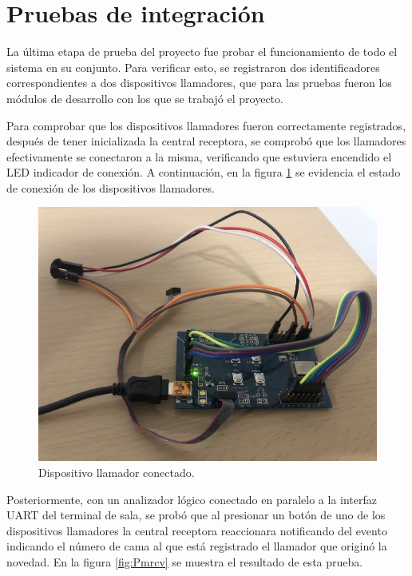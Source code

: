 \section{Pruebas de integración}
\label{sec:pruebasInt}

La última etapa de prueba del proyecto fue probar el funcionamiento de todo el sistema en su conjunto. Para verificar esto, se registraron dos identificadores correspondientes a dos dispositivos llamadores, que para las pruebas fueron los módulos de desarrollo con los que se trabajó el proyecto.

Para comprobar que los dispositivos llamadores fueron correctamente registrados, después de tener inicializada la central receptora, se comprobó que los llamadores efectivamente se conectaron a la misma, verificando que estuviera encendido el LED indicador de conexión. A continuación, en la figura \ref{fig:Pmcon} se evidencia el estado de conexión de los dispositivos llamadores.

\begin{figure}[htpb]
	\centering
	\includegraphics[scale=0.45]{./Figures/callcon.jpeg}	
	\caption{Dispositivo llamador conectado.}
	\label{fig:Pmcon}
\end{figure}

Posteriormente, con un analizador lógico conectado en paralelo a la interfaz UART del terminal de sala, se probó que al presionar un botón de uno de los dispositivos llamadores la central receptora reaccionara notificando del evento indicando el número de cama al que está registrado el llamador que originó la novedad. En la figura \ref{fig:Pmrcv} se muestra el resultado de esta prueba.

